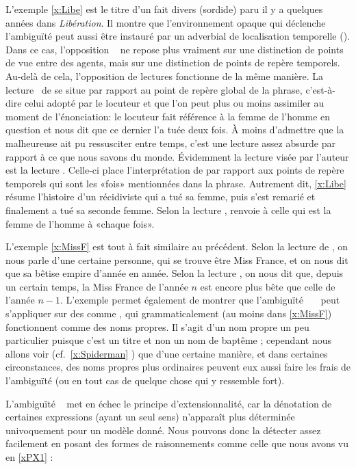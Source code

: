 L'exemple \ref{x:Libe} est le titre d'un fait divers (sordide) paru il y a quelques années dans \emph{Libération}. Il montre que l'environnement opaque qui déclenche l'ambiguïté peut aussi être instauré par un adverbial de localisation temporelle (). Dans ce cas, l'opposition {\dere} {\vs}\ {\dedicto} ne repose plus vraiment sur une distinction de points de vue entre des agents, mais sur une distinction de points de repère temporels.  Au-delà de cela, l'opposition de lectures fonctionne de la même manière. 
La lecture \dere\ de  se situe par rapport au point de repère global de la phrase, c'est-à-dire celui adopté par le locuteur et que l'on peut plus ou moins assimiler au moment de l'énonciation: le locuteur fait référence à la femme de l'homme en question et nous dit que ce dernier l'a tuée deux fois.  À moins d'admettre que la malheureuse ait pu ressusciter entre temps, c'est une lecture assez absurde par rapport à ce que nous savons du monde. Évidemment la lecture visée par l'auteur est la lecture \dedicto. Celle-ci place l'interprétation de  par rapport aux points de repère temporels qui sont les «fois» mentionnées dans la phrase. Autrement dit,  \ref{x:Libe} résume l'histoire d'un récidiviste qui a tué sa femme, puis s'est remarié et finalement a tué sa seconde femme.  Selon la lecture \dedicto,  renvoie à celle qui est la femme de l'homme à «chaque fois».

L'exemple \ref{x:MissF} est tout à fait similaire au précédent. Selon la lecture {\dere} de , on nous parle d'une certaine personne, qui se trouve être Miss France, et on nous dit que sa bêtise empire d'année en année. Selon la lecture \dedicto, on nous dit que, depuis un certain temps, la Miss France de l'année $n$ est encore plus bête que celle de l'année $n-1$. 
L'exemple permet également de montrer que l'ambiguïté \dedicto\ \vs\ \dere\ peut s'appliquer sur des {\GN} comme , qui grammaticalement (au moins dans \ref{x:MissF}) fonctionnent comme des noms propres. Il s'agit d'un nom propre un peu particulier puisque c'est un titre et non un nom de baptême ; cependant nous allons voir (cf.\ \ref{x:Spiderman} ) que d'une certaine manière, et dans certaines circonstances, des noms propres plus ordinaires peuvent eux aussi faire les frais de l'ambiguïté (ou en tout cas de quelque chose qui y ressemble fort).

\medskip

L'ambiguïté  \vs\  met en échec le principe d'extensionnalité, car la dénotation de certaines expressions (ayant un seul sens) n'apparaît plus déterminée univoquement pour un modèle donné.  Nous pouvons donc la détecter assez facilement en posant des formes de raisonnements comme celle que nous avons vu en \ref{xPX1} : 

